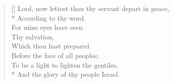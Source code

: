 \documentclass[MAIN]{subfiles}
\begin{document}
\settowidth{\versewidth}{Lord, now lettest thou thy servant depart in peace,}
\begin{verse}[\versewidth]
Lord, now lettest thou thy servant depart in peace,\\*
\vin According to thy word.\\
For mine eyes have seen\\
\vin Thy salvation,\\
Which thou hast prepared\\
\vin Before the face of all peoples;\\
To be a light to lighten the gentiles,\\*
\vin And the glory of thy people Israel.
\end{verse}
\end{document}
